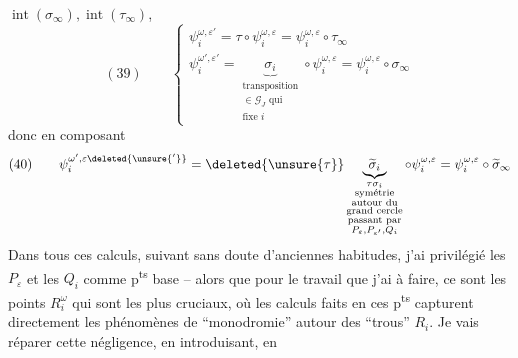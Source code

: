 $\operatorname{int}(\sigma_\infty),\operatorname{int}(\tau_\infty)$,
\[
(39)\qquad\begin{cases}
\psi_i^{\omega,\varepsilon'}=\tau\circ\psi_i^{\omega,\varepsilon}=\psi_i^{\omega,\varepsilon}\circ\tau_\infty\\[5pt]
\psi_i^{\omega',\varepsilon'}=\underbrace{\sigma_i}_{\substack{\text{transposition}\\\in\mathcal G_J\text{ qui}\\\text{fixe }i}}\circ\psi_i^{\omega,\varepsilon}=\psi_i^{\omega,\varepsilon}\circ\sigma_\infty
\end{cases}
\]
donc en composant
\[
(40)\qquad\psi_i^{\omega',\varepsilon\deleted{\unsure{'}}}=\deleted{\unsure{\tau}}\underbrace{\widetilde\sigma_i}_{\substack{\tau\sigma_i\\\text{symétrie}\\\text{autour du}\\\text{grand cercle}\\\text{passant par}\\P_\varepsilon,P_{\varepsilon'},Q_i}}\circ\psi_i^{\omega,\varepsilon}=\psi_i^{\omega,\varepsilon}\circ\widetilde\sigma_\infty
\]
Dans tous ces calculs, suivant sans doute d'anciennes habitudes, j'ai privilégié les $P_\varepsilon$ et les $Q_i$ comme p\textsuperscript{ts} base -- alors que pour le travail que j'ai à faire, ce sont les points $R_i^\omega$ qui sont les plus cruciaux, où les calculs faits en ces p\textsuperscript{ts} capturent directement les phénomènes de ``monodromie'' autour des ``trous'' $R_i$. Je vais réparer cette négligence, en introduisant, en


